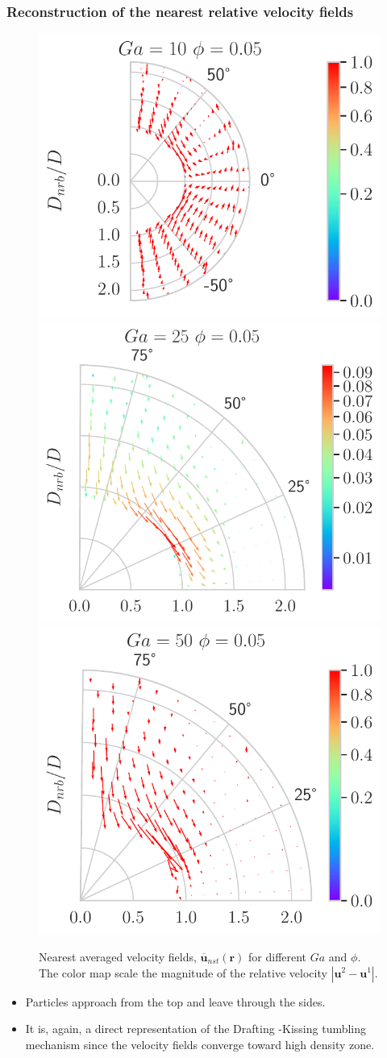 \documentclass{sintefbeamer}
\newcommand{\nstavg}[1]{\overline{#1}_{nst}}
\begin{document}
\begin{frame}
  \frametitle{Reconstruction of the nearest relative velocity fields}

  \begin{figure}

    \includegraphics[height=0.2\textwidth]{image/Dim_3/fDrop/Dmin_Theta_U_rel_Ga_10_PHI_0_05.pdf}
    \includegraphics[height=0.2\textwidth]{image/Dim_3/fDrop/Dmin_Theta_U_rel_Ga_25_PHI_0_05.pdf}
    \includegraphics[height=0.2\textwidth]{image/Dim_3/fDrop/Dmin_Theta_U_rel_Ga_50_PHI_0_05.pdf}
    
    \caption{Nearest averaged velocity fields, $\nstavg{\textbf{u}} (\textbf{r})$ for different $Ga$ and $\phi$. The color map scale the magnitude of the relative velocity $|\textbf{u}^2 - \textbf{u}^1|$. }
  \end{figure}

\begin{itemize}
  \item Particles approach from the top and leave through the sides. 
  \item It is, again, a direct representation of the Drafting -Kissing tumbling mechanism since the velocity fields converge toward high density zone. 
\end{itemize}
\end{frame}
\end{document}
